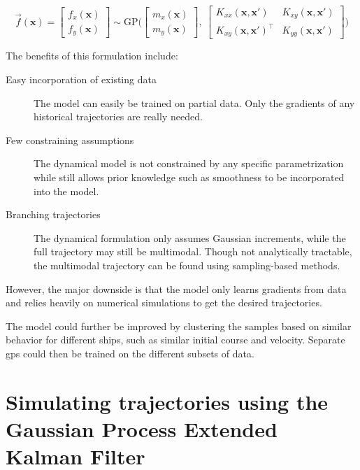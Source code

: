 \begin{equation}\label{eq:gp_vec_field}
    \vec{f}(\boldsymbol{x}) = \begin{bmatrix} f_x (\boldsymbol{x})\\ f_y (\boldsymbol{x})\end{bmatrix} \sim \text{GP} \big(\begin{bmatrix} m_x(\boldsymbol{x})\\m_y(\boldsymbol{x})\end{bmatrix}, \ \begin{bmatrix}
            K_{xx}(\boldsymbol{x}, \boldsymbol{x}') & K_{xy}(\boldsymbol{x}, \boldsymbol{x}') \\ K_{xy}(\boldsymbol{x}, \boldsymbol{x}')^\intercal & K_{yy}(\boldsymbol{x}, \boldsymbol{x}')
        \end{bmatrix}\big)
\end{equation}

The benefits of this formulation include:
\begin{description}
    \item[Easy incorporation of existing data] The model can easily be trained on partial data. Only the gradients of any historical trajectories are really needed.
    \item[Few constraining assumptions] The dynamical model is not constrained by any specific parametrization while still allows prior knowledge such as smoothness to be incorporated into the model.
    \item[Branching trajectories] The dynamical formulation only assumes Gaussian increments, while the full trajectory may still be multimodal. Though not analytically tractable, the multimodal trajectory can be found using sampling-based methods.
\end{description}

However, the major downside is that the model only learns gradients from data and relies heavily on numerical simulations to get the desired trajectories.

The model could further be improved by clustering the samples based on similar behavior for different ships, such as similar initial course and velocity. Separate \acrshort{gp}s could then be trained on the different subsets of data.

\section{Simulating trajectories using the Gaussian Process Extended Kalman Filter}

